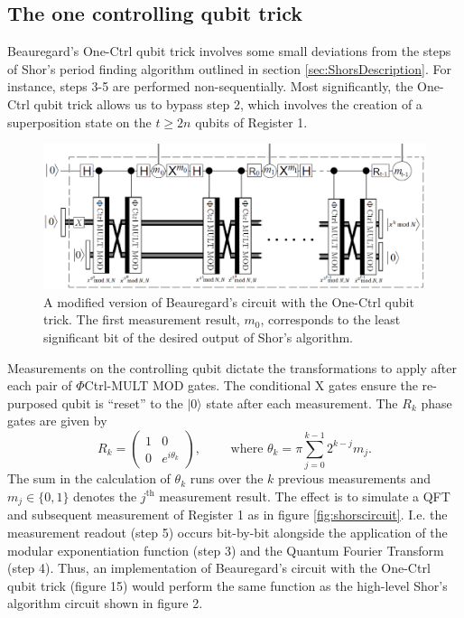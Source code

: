 \documentclass{article}
\begin{document}
\subsection{The one controlling qubit trick}
\label{sec:1ctrltrick}
Beauregard's One-Ctrl qubit trick \cite{Bea03} involves some small deviations from the steps of Shor's period finding algorithm outlined in section \ref{sec:ShorsDescription}. For instance, steps 3-5 are performed non-sequentially. Most significantly, the One-Ctrl qubit trick allows us to bypass step 2, which involves the creation of a superposition state on the $t\geq 2n$ qubits of Register 1. 
\begin{figure}[!htbp]
\centering
\includegraphics[width=1\textwidth]
{PHIEXPMOD.png}
\captionsetup{format = hang}
\caption{A modified version of Beauregard's circuit with the One-Ctrl qubit trick. The first measurement result, $m_0$, corresponds to the least significant bit of the desired output of Shor's algorithm.}
\label{fig:PHIEXPMOD}
\end{figure}

Measurements on the controlling qubit dictate the transformations to apply after each pair of $\Phi$Ctrl-MULT MOD gates. The conditional X gates ensure the re-purposed qubit is ``reset'' to the $|0\rangle$ state after each measurement. The $R_k$ phase gates are given by 
\begin{equation*}
R_k = \left( \begin{matrix} 1&0\\ 0&e^{i \theta_k} \end{matrix} \right), \qquad \text{  where  } \theta_k = \pi \sum_{j=0}^{k-1} 2^{k-j}m_j.
\end{equation*}
The sum in the calculation of $\theta_k$ runs over the $k$ previous measurements and $m_j \in \{0,1\}$ denotes the $j^\text{th}$ measurement result. The effect is to simulate a QFT and subsequent measurement of Register 1 as in figure \ref{fig:shorscircuit}. I.e. the measurement readout (step 5) occurs bit-by-bit alongside the application of the modular exponentiation function (step 3) and the Quantum Fourier Transform (step 4).  Thus, an implementation of Beauregard’s circuit with the One-Ctrl qubit trick (figure 15) would perform the same function as the high-level Shor’s algorithm circuit shown in figure 2.
\end{document}
